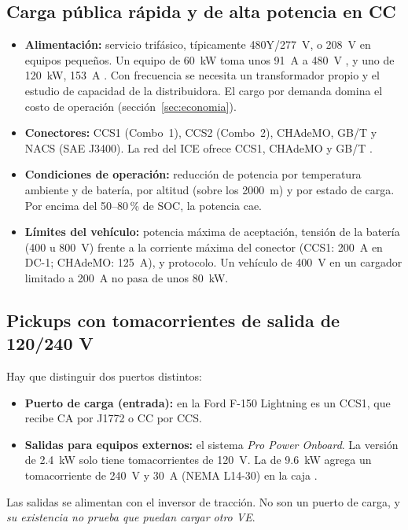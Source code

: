 \subsection{Carga pública rápida y de alta potencia en CC}
\begin{itemize}
\item \textbf{Alimentación:} servicio trifásico, típicamente 480Y/277~V, o 208~V en equipos pequeños. Un equipo de \SI{60}{\kilo\watt} toma unos \SI{91}{\ampere} a 480~V \cite{autelDC}, y uno de \SI{120}{\kilo\watt}, \SI{153}{\ampere} \cite{abbTerra124}. Con frecuencia se necesita un transformador propio y el estudio de capacidad de la distribuidora. El cargo por demanda domina el costo de operación (sección~\ref{sec:economia}).
\item \textbf{Conectores:} CCS1 (Combo~1), CCS2 (Combo~2), CHAdeMO, GB/T y NACS (SAE J3400). La red del ICE ofrece CCS1, CHAdeMO y GB/T \cite{delfinoAresep}.
\item \textbf{Condiciones de operación:} reducción de potencia por temperatura ambiente y de batería, por altitud (sobre los 2000~m) y por estado de carga. Por encima del 50--80\,\% de SOC, la potencia cae.
\item \textbf{Límites del vehículo:} potencia máxima de aceptación, tensión de la batería (400 u 800~V) frente a la corriente máxima del conector (CCS1: \SI{200}{\ampere} en DC-1; CHAdeMO: \SI{125}{\ampere}), y protocolo. Un vehículo de 400~V en un cargador limitado a \SI{200}{\ampere} no pasa de unos \SI{80}{\kilo\watt}.
\end{itemize}

\subsection{Pickups con tomacorrientes de salida de 120/240 V}
Hay que distinguir dos puertos distintos:
\begin{itemize}
\item \textbf{Puerto de carga (entrada):} en la Ford F-150 Lightning es un CCS1, que recibe CA por J1772 o CC por CCS.
\item \textbf{Salidas para equipos externos:} el sistema \emph{Pro Power Onboard}. La versión de \SI{2.4}{\kilo\watt} solo tiene tomacorrientes de 120~V. La de \SI{9.6}{\kilo\watt} agrega un tomacorriente de 240~V y \SI{30}{\ampere} (NEMA L14-30) en la caja \cite{fordFAQ}.
\end{itemize}
Las salidas se alimentan con el inversor de tracción. No son un puerto de carga, y \emph{su existencia no prueba que puedan cargar otro VE}.

